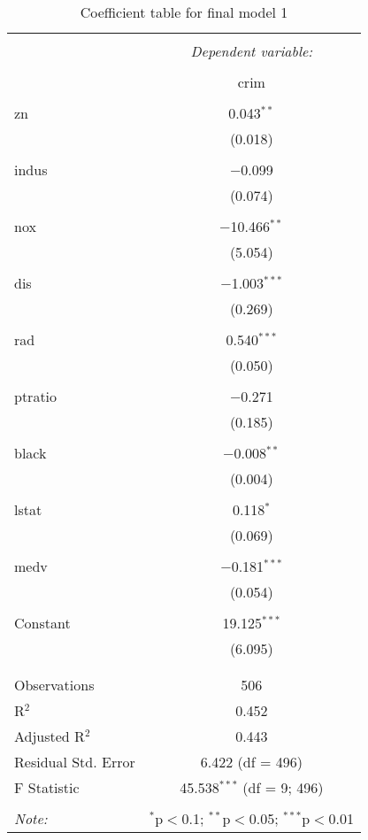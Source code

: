 \documentclass{article}
\begin{document}
\begin{table}[!htbp] \centering 
  \caption{Coefficient table for final model 1} 
  \label{} 
\begin{tabular}{@{\extracolsep{5pt}}lc} 
\\[-1.8ex]\hline 
\hline \\[-1.8ex] 
 & \multicolumn{1}{c}{\textit{Dependent variable:}} \\ 
\cline{2-2} 
\\[-1.8ex] & crim \\ 
\hline \\[-1.8ex] 
 zn & 0.043$^{**}$ \\ 
  & (0.018) \\ 
  & \\ 
 indus & $-$0.099 \\ 
  & (0.074) \\ 
  & \\ 
 nox & $-$10.466$^{**}$ \\ 
  & (5.054) \\ 
  & \\ 
 dis & $-$1.003$^{***}$ \\ 
  & (0.269) \\ 
  & \\ 
 rad & 0.540$^{***}$ \\ 
  & (0.050) \\ 
  & \\ 
 ptratio & $-$0.271 \\ 
  & (0.185) \\ 
  & \\ 
 black & $-$0.008$^{**}$ \\ 
  & (0.004) \\ 
  & \\ 
 lstat & 0.118$^{*}$ \\ 
  & (0.069) \\ 
  & \\ 
 medv & $-$0.181$^{***}$ \\ 
  & (0.054) \\ 
  & \\ 
 Constant & 19.125$^{***}$ \\ 
  & (6.095) \\ 
  & \\ 
\hline \\[-1.8ex] 
Observations & 506 \\ 
R$^{2}$ & 0.452 \\ 
Adjusted R$^{2}$ & 0.443 \\ 
Residual Std. Error & 6.422 (df = 496) \\ 
F Statistic & 45.538$^{***}$ (df = 9; 496) \\ 
\hline 
\hline \\[-1.8ex] 
\textit{Note:}  & \multicolumn{1}{r}{$^{*}$p$<$0.1; $^{**}$p$<$0.05; $^{***}$p$<$0.01} \\ 
\end{tabular} 
\end{table}
\newpage
\end{document}
